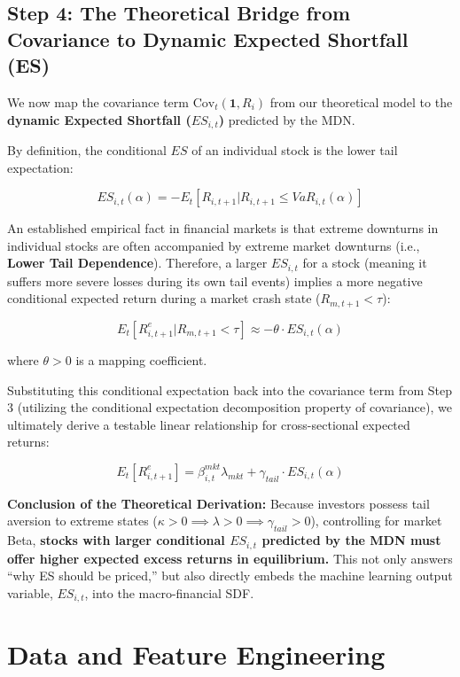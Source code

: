 \documentclass[12pt]{article}
\begin{document}
\subsection{Step 4: The Theoretical Bridge from Covariance to Dynamic Expected Shortfall (ES)}

We now map the covariance term $\text{Cov}_t(\mathbf{1}, R_i)$ from our theoretical model to the \textbf{dynamic Expected Shortfall ($ES_{i,t}$)} predicted by the MDN.

By definition, the conditional $ES$ of an individual stock is the lower tail expectation:

$$ES_{i,t}(\alpha) = - E_t [ R_{i,t+1} | R_{i,t+1} \le VaR_{i,t}(\alpha) ]$$

An established empirical fact in financial markets is that extreme downturns in individual stocks are often accompanied by extreme market downturns (i.e., \textbf{Lower Tail Dependence}). Therefore, a larger $ES_{i,t}$ for a stock (meaning it suffers more severe losses during its own tail events) implies a more negative conditional expected return during a market crash state ($R_{m,t+1} < \tau$):

$$E_t [ R_{i,t+1}^e | R_{m,t+1} < \tau ] \approx - \theta \cdot ES_{i,t}(\alpha)$$

where $\theta > 0$ is a mapping coefficient.

Substituting this conditional expectation back into the covariance term from Step 3 (utilizing the conditional expectation decomposition property of covariance), we ultimately derive a testable linear relationship for cross-sectional expected returns:

$$E_t[R_{i,t+1}^e] = \beta_{i,t}^{mkt} \lambda_{mkt} + \gamma_{tail} \cdot ES_{i,t}(\alpha)$$

\textbf{Conclusion of the Theoretical Derivation:} 
Because investors possess tail aversion to extreme states ($\kappa > 0 \implies \lambda > 0 \implies \gamma_{tail} > 0$), controlling for market Beta, \textbf{stocks with larger conditional $ES_{i,t}$ predicted by the MDN must offer higher expected excess returns in equilibrium.} This not only answers ``why ES should be priced,'' but also directly embeds the machine learning output variable, $ES_{i,t}$, into the macro-financial SDF.

\section{Data and Feature Engineering}
\label{sec:data_feature_engineering}
\end{document}
